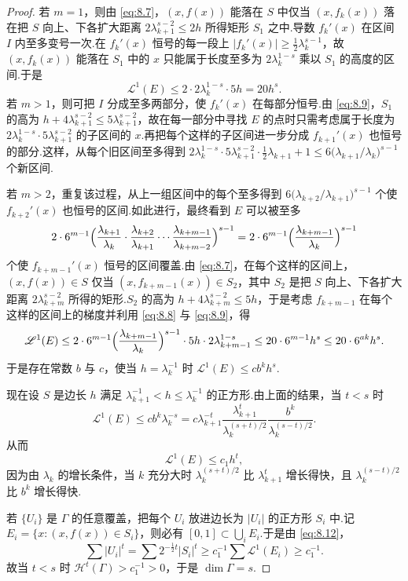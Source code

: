 \begin{proof}
若 $m=1$，则由 \eqref{eq:8.7}，$(x,f(x))$ 能落在 $S$ 中仅当 $(x,f_k(x))$ 落在把 $S$ 向上、下各扩大距离 $2\lambda_{k+1}^{s-2}\leq 2h$ 所得矩形 $S_1$ 之中.导数 $f_k'(x)$ 在区间 $I$ 内至多变号一次.在 $f_k'(x)$ 恒号的每一段上 $|f_k'(x)|\geq\frac{1}{2}\lambda_k^{s-1}$，故 $(x,f_k(x))$ 能落在 $S_1$ 中的 $x$ 只能属于长度至多为 $2\lambda_k^{1-s}$ 乘以 $S_1$ 的高度的区间.于是
\begin{equation}\label{eq:8.11}
  \mathscr{L}^{1}(E)\leq 2\cdot 2\lambda_k^{1-s}\cdot 5h=20h^{s}.
\end{equation}
若 $m>1$，则可把 $I$ 分成至多两部分，使 $f_k'(x)$ 在每部分恒号.由 \eqref{eq:8.9}，$S_1$ 的高为 $h+4\lambda_{k+1}^{s-2}\leq 5\lambda_{k+1}^{s-2}$，故在每一部分中寻找 $E$ 的点时只需考虑属于长度为 $2\lambda_k^{1-s}\cdot 5\lambda_{k+1}^{s-2}$ 的子区间的 $x$.再把每个这样的子区间进一步分成 $f_{k+1}'(x)$ 也恒号的部分.这样，从每个旧区间至多得到 $2\lambda_k^{1-s}\cdot 5\lambda_{k+1}^{s-2}\cdot\frac{1}{2}\lambda_{k+1}+1\leq 6\bigl(\lambda_{k+1}/\lambda_k\bigr)^{s-1}$ 个新区间.

若 $m>2$，重复该过程，从上一组区间中的每个至多得到 $6\bigl(\lambda_{k+2}/\lambda_{k+1}\bigr)^{s-1}$ 个使 $f_{k+2}'(x)$ 也恒号的区间.如此进行，最终看到 $E$ 可以被至多
\[
  2\cdot 6^{m-1}\Bigl(\frac{\lambda_{k+1}}{\lambda_k}\cdot\frac{\lambda_{k+2}}{\lambda_{k+1}}\cdots\frac{\lambda_{k+m-1}}{\lambda_{k+m-2}}\Bigr)^{s-1}
  =2\cdot 6^{m-1}\Bigl(\frac{\lambda_{k+m-1}}{\lambda_k}\Bigr)^{s-1}
\]
个使 $f_{k+m-1}'(x)$ 恒号的区间覆盖.由 \eqref{eq:8.7}，在每个这样的区间上，$(x,f(x))\in S$ 仅当 $(x,f_{k+m-1}(x))\in S_2$，其中 $S_2$ 是把 $S$ 向上、下各扩大距离 $2\lambda_{k+m}^{s-2}$ 所得的矩形.$S_2$ 的高为 $h+4\lambda_{k+m}^{s-2}\leq 5h$，于是考虑 $f_{k+m-1}$ 在每个这样的区间上的梯度并利用 \eqref{eq:8.8} 与 \eqref{eq:8.9}，得
\[
  \mathscr{L}^{1}(E)
  \leq 2\cdot 6^{m-1}\Bigl(\frac{\lambda_{k+m-1}}{\lambda_k}\Bigr)^{s-1}\cdot 5h\cdot 2\lambda_{k+m-1}^{1-s}
  \leq 20\cdot 6^{m-1}h^{s}\leq 20\cdot 6^{ak}h^{s}.
\]
于是存在常数 $b$ 与 $c$，使当 $h=\lambda_k^{-1}$ 时 $\mathscr{L}^1(E)\leq cb^kh^s$.

现在设 $S$ 是边长 $h$ 满足 $\lambda_{k+1}^{-1}<h\leq\lambda_k^{-1}$ 的正方形.由上面的结果，当 $t<s$ 时
\[
  \mathscr{L}^{1}(E)\leq cb^{k}\lambda_k^{-s}
  =c\lambda_{k+1}^{-t}\frac{\lambda_{k+1}^{t}}{\lambda_k^{(s+t)/2}}\frac{b^{k}}{\lambda_k^{(s-t)/2}}.
\]
从而
\begin{equation}\label{eq:8.12}
  \mathscr{L}^{1}(E)\leq c_1h^{t},
\end{equation}
因为由 $\lambda_k$ 的增长条件，当 $k$ 充分大时 $\lambda_k^{(s+t)/2}$ 比 $\lambda_{k+1}^{t}$ 增长得快，且 $\lambda_k^{(s-t)/2}$ 比 $b^k$ 增长得快.

若 $\{U_i\}$ 是 $\Gamma$ 的任意覆盖，把每个 $U_i$ 放进边长为 $|U_i|$ 的正方形 $S_i$ 中.记 $E_i=\{x:(x,f(x))\in S_i\}$，则必有 $[0,1]\subset\bigcup_i E_i$.于是由 \eqref{eq:8.12}，
\[
  \sum|U_i|^{t}=\sum 2^{-\frac{1}{2}t}|S_i|^{t}\geq c_1^{-1}\sum\mathscr{L}^{1}(E_i)\geq c_1^{-1}.
\]
故当 $t<s$ 时 $\mathcal{H}^t(\Gamma)>c_1^{-1}>0$，于是 $\dim\Gamma=s$.
\end{proof}

